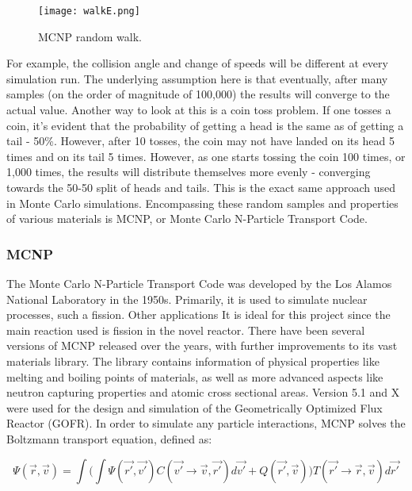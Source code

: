 \begin{figure}[!htbp]
\centering
\texttt{[image: walkE.png]}
\caption{MCNP random walk.}
\label{fig:randomwalk}
\end{figure}

For example, the collision angle and change of speeds will be different at every simulation run. The underlying assumption here is that eventually, after many samples (on the order of magnitude of 100,000) the results will converge to the actual value. Another way to look at this is a coin toss problem. If one tosses a coin, it's evident that the probability of getting a head is the same as of getting a tail - 50\%. However, after 10 tosses, the coin may not have landed on its head 5 times and on its tail 5 times. However, as one starts tossing the coin 100 times, or 1,000 times, the results will distribute themselves more evenly - converging towards the 50-50 split of heads and tails. This is the exact same approach used in Monte Carlo simulations. Encompassing these random samples and properties of various materials is MCNP, or Monte Carlo N-Particle Transport Code.

\subsubsection{MCNP}

The Monte Carlo N-Particle Transport Code was developed by the Los Alamos National Laboratory in the 1950s. Primarily, it is used to simulate nuclear processes, such a fission. Other applications It is ideal for this project since the main reaction used is fission in the novel reactor. There have been several versions of MCNP released over the years, with further improvements to its vast materials library. The library contains information of physical properties like melting and boiling points of materials, as well as more advanced aspects like neutron capturing properties and atomic cross sectional areas. Version 5.1 and X were used for the design and simulation of the Geometrically Optimized Flux Reactor (GOFR). In order to simulate any particle interactions, MCNP solves the Boltzmann transport equation, defined as:

\begin{equation}
\Psi(\vec{r},\vec{v}) = \int\Big(\int\Psi(\vec{r'},\vec{v'})C(\vec{v'}\rightarrow \vec{v},\vec{r'})d\vec{v'} + Q(\vec{r'},\vec{v})\Big)T(\vec{r'}\rightarrow \vec{r},\vec{v})d\vec{r'}
\end{equation}

